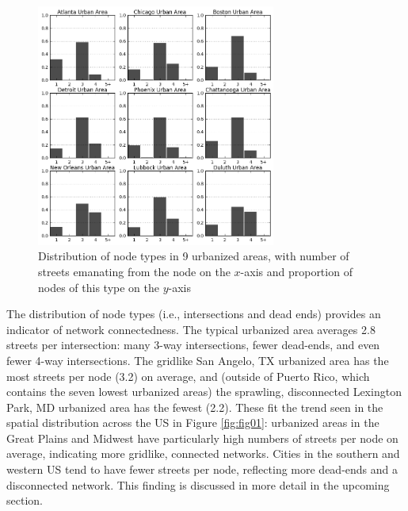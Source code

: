 \documentclass[Afour,sageh,times]{sagej}
\begin{document}
\begin{figure}
	\includegraphics[width=0.7\textwidth]{fig02.png}
	\caption{Distribution of node types in 9 urbanized areas, with number of streets emanating from the node on the $x$-axis and proportion of nodes of this type on the $y$-axis }
	\label{fig:fig02}
\end{figure}

The distribution of node types (i.e., intersections and dead ends) provides an indicator of network connectedness. The typical urbanized area averages 2.8 streets per intersection: many 3-way intersections, fewer dead-ends, and even fewer 4-way intersections. The gridlike San Angelo, TX urbanized area has the most streets per node (3.2) on average, and (outside of Puerto Rico, which contains the seven lowest urbanized areas) the sprawling, disconnected Lexington Park, MD urbanized area has the fewest (2.2). These fit the trend seen in the spatial distribution across the US in Figure \ref{fig:fig01}: urbanized areas in the Great Plains and Midwest have particularly high numbers of streets per node on average, indicating more gridlike, connected networks. Cities in the southern and western US tend to have fewer streets per node, reflecting more dead-ends and a disconnected network. This finding is discussed in more detail in the upcoming section.
\end{document}
